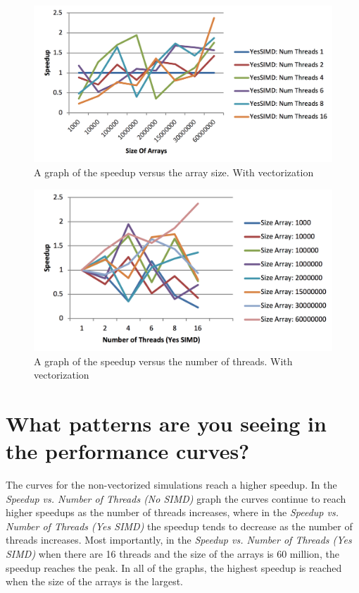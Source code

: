 \documentclass[onecolumn,draftclsnofoot, 10pt, compsoc]{IEEEtran}
\begin{document}
				\begin{figure}[H]
				\includegraphics[width=16cm]{yesSimSpeedVsNums}
				\centering
				\caption{A graph of the speedup versus the array size. With vectorization}
			\end{figure}
			
			\begin{figure}[H]
				\includegraphics[width=16cm]{yesSimSpeedVsThreads}
				\centering
				\caption{A graph of the speedup versus the number of threads. With vectorization}
			\end{figure}
		
	
	
	\clearpage
	
	\section{What patterns are you seeing in the performance curves?}
		The curves for the non-vectorized simulations reach a higher speedup.
		In the \textit{Speedup vs. Number of Threads (No SIMD)} graph the curves continue to reach higher speedups as the number of threads increases, where in the \textit{Speedup vs. Number of Threads (Yes SIMD)} the speedup tends to decrease as the number of threads increases. Most importantly, in the \textit{Speedup vs. Number of Threads (Yes SIMD)} when there are 16 threads and the size of the arrays is 60 million, the speedup reaches the peak. In all of the graphs, the highest speedup is reached when the size of the arrays is the largest.
	
\end{document}

